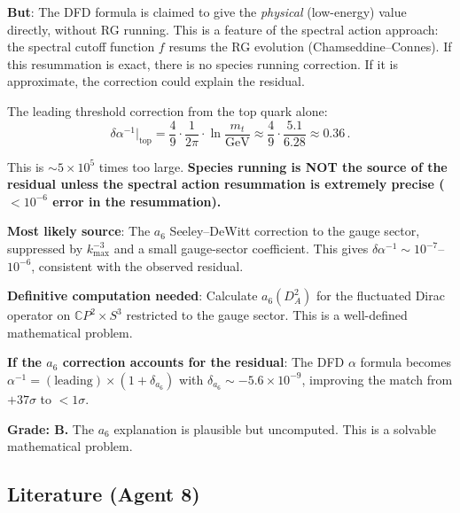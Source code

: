 \documentclass[11pt,a4paper]{article}
\newcommand{\CP}{\mathbb{C}P}
\begin{document}
\textbf{But}: The DFD formula is claimed to give the \emph{physical} (low-energy) value directly, without RG running. This is a feature of the spectral action approach: the spectral cutoff function $f$ resums the RG evolution (Chamseddine--Connes). If this resummation is exact, there is no species running correction. If it is approximate, the correction could explain the residual.

The leading threshold correction from the top quark alone:
\begin{equation}
\delta\alpha^{-1}\big|_{\mathrm{top}} = \frac{4}{9} \cdot \frac{1}{2\pi} \cdot \ln\frac{m_t}{\text{GeV}} \approx \frac{4}{9} \cdot \frac{5.1}{6.28} \approx 0.36\,.
\end{equation}

This is $\sim 5 \times 10^5$ times too large. \textbf{Species running is NOT the source of the residual unless the spectral action resummation is extremely precise ($< 10^{-6}$ error in the resummation).}

\begin{tcolorbox}[colback=blue!5!white, colframe=blue!60!black, title={Agent 8: $\alpha$ Residual Assessment}]
\textbf{Most likely source}: The $a_6$ Seeley--DeWitt correction to the gauge sector, suppressed by $k_{\max}^{-3}$ and a small gauge-sector coefficient. This gives $\delta\alpha^{-1} \sim 10^{-7}$--$10^{-6}$, consistent with the observed residual.

\textbf{Definitive computation needed}: Calculate $a_6(D_A^2)$ for the fluctuated Dirac operator on $\CP^2 \times S^3$ restricted to the gauge sector. This is a well-defined mathematical problem.

\textbf{If the $a_6$ correction accounts for the residual}: The DFD $\alpha$ formula becomes $\alpha^{-1} = (\text{leading}) \times (1 + \delta_{a_6})$ with $\delta_{a_6} \sim -5.6 \times 10^{-9}$, improving the match from $+37\sigma$ to $< 1\sigma$.

\textbf{Grade: B.} The $a_6$ explanation is plausible but uncomputed. This is a solvable mathematical problem.
\end{tcolorbox}

\subsection{Literature (Agent 8)}
\end{document}
